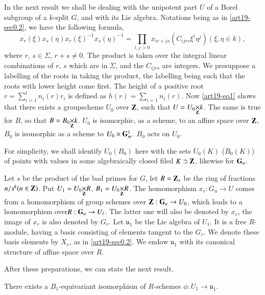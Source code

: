 In the next result we shall be dealing with the unipotent part $U$ of a Borel subgroup of a $k$-split $G$, and with its Lie algebra. Notations being as in \ref{art19-sec0.2}, we have the following formula,
\begin{equation}
x_{r}(\xi)x_{s}(\eta)x_{r}(\xi)^{-1}x_{s}(\eta)^{-1}=\prod\limits_{i,j>0}x_{ir+js}(C_{ijrs}\xi^{i}\eta^{j})(\xi,\eta\in k),\label{art19-eq1}
\end{equation}
where $r$, $s\in \Sigma$, $r+s\neq 0$. The product is taken over the integral linear combinations of $r$, $s$ which are in $\Sigma$, and the $C_{ijrs}$ are integers. We presuppose a labelling of the roots in taking the product, the labelling being such that the roots with lower height come first. The height of a positive root $r=\sum\limits^{l}_{i=1}n_{i}(r)r_{i}$ is defined as $h(r)=\sum\limits_{i=1}n_{i}(r)$. Now \eqref{art19-eq1} shows that there exists a groupscheme $U_{0}$ over $\mathbf{Z}$, such that $U=\fprod{U_{0}}{k}{\bfZ}$. The same is true for $B$, so that $B=\fprod{B_{0}}{k}{\bfZ}$. $U_{0}$ is isomorphic, as a scheme, to an affine space over $\mathbf{Z}$, $B_{0}$ is isomorphic as a scheme to $U_{0}\times \mathbf{G}^{1}_{m}$. $B_{0}$ acts on $U_{0}$.

For simplicity, we shall identify $U_{0}(B_{0})$ here with the sets $U_{0}(K)$ ($B_{0}(K)$) of points with values in some algebraically closed filed $K\supset \mathbf{Z}$, likewise for $\mathbf{G}_{a}$.

Let $s$ be the product of the bad primes for $G$, let $R=\mathbf{Z}_{s}$ be the ring of fractions $n/s^{k}(n\in \mathbf{Z})$. Put $U_{1}=\fprod{U_{0}}{R}{\bfZ}$, $B_{1}=\fprod{U_{0}}{R}{\bfZ}$. The homomorphism $x_{r}:G_{a}\to U$ comes from a homomorphism of group schemes over $\mathbf{Z}:\mathbf{G}_{a}\to U_{0}$, which leads to a homomorphism over\pageoriginale $R:\mathbf{G}_{a}\to U_{l}$. The latter one will also be denoted by $x_{r}$, the image of $x_{r}$ is also denoted by $G_{r}$. Let $\mathfrak{u}_{1}$ be the Lie algebra of $U_{1}$. It is a free $R$-module, having a basis consisting of elements tangent to the $G_{r}$. We denote these basis elements by $X_{r}$, as in \ref{art19-sec0.2}. We endow $\mathfrak{u}_{1}$ with its canonical structure of affine space over $R$.

After these preparations, we can state the next result.

\begin{proposition}\label{art19-prop3.5}
There exists a $B_{1}$-equivariant isomorphism of $R$-schemes $\phi:U_{1}\to \mathfrak{u}_{1}$.
\end{proposition}

